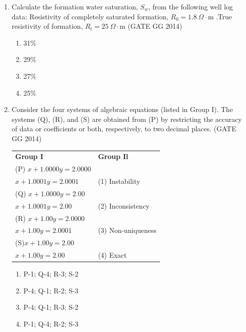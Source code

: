 \documentclass[journal]{IEEEtran}
\begin{document}
\begin{enumerate}[start=26]
\item Calculate the formation water saturation, $S_w$, from the following well log data: Resistivity of completely saturated formation, $R_0 = 1.8\ \Omega \cdot$m .True resistivity of formation, $R_t = 25\ \Omega \cdot$m  
\hfill(GATE GG 2014)
\begin{multicols}{2}
    \begin{enumerate}
    \item 31\%
    \item 29\%
    \item 27\%
    \item 25\%
    \end{enumerate}
\end{multicols}

\item Consider the four systems of algebraic equations (listed in Group I).  
The systems (Q), (R), and (S) are obtained from (P) by restricting the accuracy of data or coefficients or both, respectively, to two decimal places.  
\hfill{(GATE GG 2014)}\\
\begin{tabular}{ l l }
\textbf{Group I} & \textbf{Group Il}\\
(P) $x + 1.0000y = 2.0000$\\$x + 1.0001y = 2.0001$  & (1) Instability \\ 
(Q) $x + 1.0000y = 2.00$\\ $x + 1.0001y = 2.00$  & (2) Inconsistency \\ 
(R) $x + 1.00y = 2.0000$\\$x + 1.00y = 2.0001$ & (3) Non-uniqueness\\
(S)$x + 1.00y = 2.00$\\$x + 1.00y = 2.00$ & (4) Exact   
\end{tabular}
\begin{multicols}{2}
    \begin{enumerate}
         \item P-1; Q-4; R-3; S-2
    \item P-4; Q-1; R-2; S-3
    \item P-4; Q-1; R-3; S-2
    \item P-1; Q-4; R-2; S-3
    \end{enumerate}
\end{multicols}


\end{enumerate}
\end{document}

